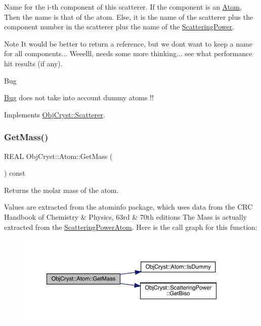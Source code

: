 Name for the i-\/th component of this scatterer. If the component is an \mbox{\hyperlink{class_obj_cryst_1_1_atom}{Atom}}, Then the name is that of the atom. Else, it is the name of the scatterer plus the component number in the scatterer plus the name of the \mbox{\hyperlink{class_obj_cryst_1_1_scattering_power}{Scattering\+Power}}. \begin{DoxyNote}{Note}
It would be better to return a reference, but we don\textquotesingle{}t want to keep a name for all components... Weeelll, needs some more thinking... see what performance hit results (if any).
\end{DoxyNote}
\begin{DoxyRefDesc}{Bug}
\item[\mbox{\hyperlink{bug__bug000001}{Bug}}]does not take into account dummy atoms !! \end{DoxyRefDesc}


Implements \mbox{\hyperlink{class_obj_cryst_1_1_scatterer_a42bdf508da6a90859a5a61e16c27d47e}{Obj\+Cryst\+::\+Scatterer}}.

\mbox{\label{class_obj_cryst_1_1_atom_a9fb77dee90fcd6bbcd199e6efa8e8c3c}} 
\subsubsection{\texorpdfstring{GetMass()}{GetMass()}}
{\footnotesize\ttfamily R\+E\+AL Obj\+Cryst\+::\+Atom\+::\+Get\+Mass (\begin{DoxyParamCaption}{ }\end{DoxyParamCaption}) const}



Returns the molar mass of the atom. 

Values are extracted from the \textquotesingle{}atominfo\textquotesingle{} package, which uses data from the C\+RC Handbook of Chemistry \& Physics, 63rd \& 70th editions The Mass is actually extracted from the \mbox{\hyperlink{class_obj_cryst_1_1_scattering_power_atom}{Scattering\+Power\+Atom}}. Here is the call graph for this function\+:
\nopagebreak
\begin{figure}[H]
\begin{center}
\leavevmode
\includegraphics[width=350pt]{class_obj_cryst_1_1_atom_a9fb77dee90fcd6bbcd199e6efa8e8c3c_cgraph}
\end{center}
\end{figure}
\mbox{\label{class_obj_cryst_1_1_atom_a5a985d3220fb8754f0db01ecde408bb9}} 
